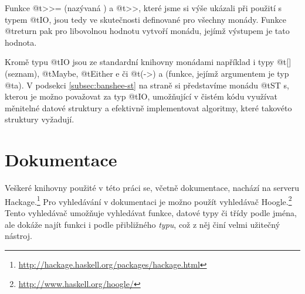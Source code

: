 Funkce @t{>>=} (nazývaná ) a @t{>>}, které jsme si výše ukázali při
použití s typem @t{IO}, jsou tedy ve skutečnosti definované pro všechny monády.
Funkce @t{return} pak pro libovolnou hodnotu vytvoří monádu, jejímž výstupem je
tato hodnota.

Kromě typu @t{IO} jsou ze standardní knihovny monádami například i typy @t{[]}
(seznam), @t{Maybe}, @t{Either e} či @t{(->) a} (funkce, jejímž argumentem je
typ @t{a}).  V podsekci \ref{subsec:banshee-st} na straně
\pageref{subsec:banshee-st} si představíme monádu @t{ST s}, kterou je možno
považovat za  typ @t{IO}, umožňující v čistém kódu využívat
měnitelné datové struktury a efektivně implementovat algoritmy, které takovéto
struktury vyžadují.

\section{Dokumentace}

Veškeré knihovny použité v této práci se, včetně dokumentace, nachází na serveru
Hackage.\footnote{\url{http://hackage.haskell.org/packages/hackage.html}} Pro
vyhledávání v dokumentaci je možno použít vyhledávač
Hoogle.\footnote{\url{http://www.haskell.org/hoogle/}} Tento vyhledávač umožňuje
vyhledávat funkce, datové typy či třídy podle jména, ale dokáže najít funkci i
podle přibližného \emph{typu}, což z něj činí velmi užitečný nástroj.
